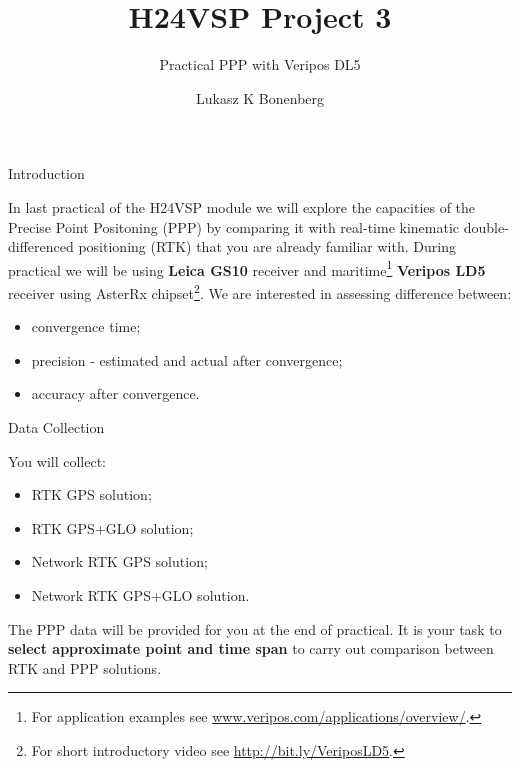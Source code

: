 \documentclass[11pt]{beamer}
\title[H24VSP]{H24VSP Project 3}
\subtitle{Practical PPP with Veripos DL5\thisDocRef}
\author{Lukasz K Bonenberg}
\institute{NGI}
\begin{document}
\maketitle

\begin{frame}[fragile]{Introduction}

	In last practical of the H24VSP module we will explore the capacities of the Precise Point Positoning (PPP) by comparing it with real-time kinematic double-differenced positioning (RTK) that you are already familiar with. During practical we will be using \textbf{Leica GS10} receiver and maritime\footnote{For application examples see \url{www.veripos.com/applications/overview/}.} \textbf{Veripos LD5} receiver using AsterRx chipset\footnote[frame]{For short introductory video see \url{http://bit.ly/VeriposLD5}.}.
    We are interested in assessing difference between:
	\begin{itemize}
		\item convergence time;
		\item precision - estimated and actual after convergence; 
		\item accuracy after convergence.
	\end{itemize}

\end{frame}




\begin{frame}{Data Collection}
	
	You will  collect:
		\begin{itemize}
			\item RTK GPS solution;
			\item RTK GPS+GLO solution;
			\item Network RTK GPS solution;
			\item Network RTK GPS+GLO solution.
		\end{itemize}

	The PPP data will be provided for you at the end of practical. It is your task to \textbf{select approximate point and time span} to carry out comparison between RTK and PPP solutions. 

\end{frame}
\end{document}
